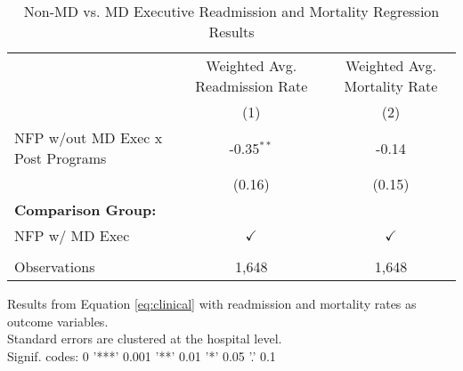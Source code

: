 \begin{table}[ht!]
   \caption{\label{tab:MD_noMD_readmort_fullsample} Non-MD vs. MD Executive Readmission and Mortality Regression Results}
   \bigskip
   \centering
   \begin{tabular}{lcc}
      \toprule
                                        & Weighted Avg. Readmission Rate & Weighted Avg. Mortality Rate\\  
                                        & (1)                            & (2)\\  
      \midrule 
      NFP w/out MD Exec x Post Programs & -0.35$^{**}$                   & -0.14\\   
                                        & (0.16)                         & (0.15)\\   
      \textbf{Comparison Group:}        &                                & \\  
      NFP w/ MD Exec                    & $\checkmark$                   & $\checkmark$\\   
       \\
      Observations                      & 1,648                          & 1,648\\  
      \bottomrule
   \end{tabular}
   
   \par \raggedright 
   Results from Equation \ref{eq:clinical} with readmission and mortality rates as outcome variables.\\
   Standard errors are clustered at the hospital level.\\
   Signif. codes: 0 '***' 0.001 '**' 0.01 '*' 0.05 '.' 0.1
\end{table}
